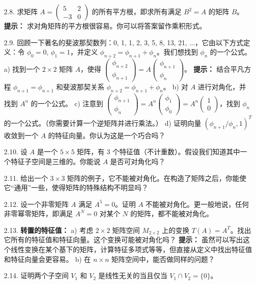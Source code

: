 2.8. 求矩阵 $A = \begin{pmatrix} 5 & 2 \\ -3 & 0 \end{pmatrix}$ 的所有平方根，即求所有满足 $B^2 = A$ 的矩阵 $B$。
\textbf{提示：} 求对角矩阵的平方根很容易。你可以将答案留作乘积形式。

2.9. 回顾一下著名的斐波那契数列：0, 1, 1, 2, 3, 5, 8, 13, 21, ...，它由以下方式定义：令 $\phi_0 = 0$, $\phi_1 = 1$，并定义 $\phi_{n+2} = \phi_{n+1} + \phi_n$。我们想找到 $\phi_n$ 的一个公式。
a) 找到一个 $2 \times 2$ 矩阵 $A$，使得 $\begin{pmatrix} \phi_{n+2} \\ \phi_{n+1} \end{pmatrix} = A \begin{pmatrix} \phi_{n+1} \\ \phi_n \end{pmatrix}$。
\textbf{提示：} 结合平凡方程 $\phi_{n+1} = \phi_{n+1}$ 和斐波那契关系 $\phi_{n+2} = \phi_{n+1} + \phi_n$。
b) 对 $A$ 进行对角化，并找到 $A^n$ 的一个公式。
c) 注意到 $\begin{pmatrix} \phi_{n+1} \\ \phi_n \end{pmatrix} = A^n \begin{pmatrix} \phi_1 \\ \phi_0 \end{pmatrix} = A^n \begin{pmatrix} 1 \\ 0 \end{pmatrix}$，找到 $\phi_n$ 的一个公式。（你需要计算一个逆矩阵并进行乘法。）
d) 证明向量 $(\phi_{n+1}/\phi_n, 1)^T$ 收敛到一个 $A$ 的特征向量。你认为这是一个巧合吗？

2.10. 设 $A$ 是一个 $5 \times 5$ 矩阵，有 3 个特征值（不计重数）。假设我们知道其中一个特征子空间是三维的。你能说 $A$ 是否可对角化吗？

2.11. 给出一个 $3 \times 3$ 矩阵的例子，它不能被对角化。在构造了矩阵之后，你能使它“通用”一些，使得矩阵的特殊结构不明显吗？

2.12. 设一个非零矩阵 $A$ 满足 $A^5 = 0$。证明 $A$ 不能被对角化。更一般地说，任何非零幂零矩阵，即满足 $A^N = 0$ 对某个 $N$ 的矩阵，都不能被对角化。

2.13. \textbf{转置的特征值：}
a) 考虑 $2 \times 2$ 矩阵空间 $M_{2 \times 2}$ 上的变换 $T(A) = A^T$。找出它所有的特征值和特征向量。这个变换可能被对角化吗？
\textbf{提示：} 虽然可以写出这个线性变换在某个基下的矩阵，计算特征多项式等等，但直接从定义中找出特征值和特征向量会更容易。
b) 在 $n \times n$ 矩阵空间中，能否做同样的问题？

2.14. 证明两个子空间 $V_1$ 和 $V_2$ 是线性无关的当且仅当 $V_1 \cap V_2 = \{0\}$。



